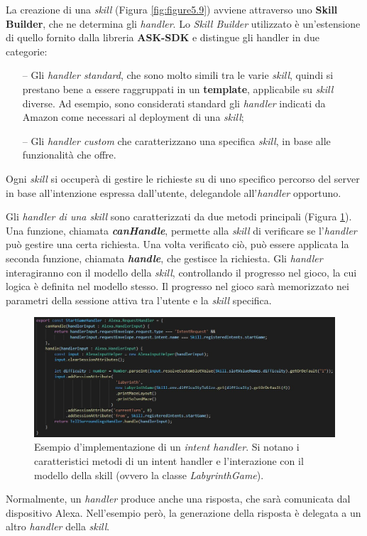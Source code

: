 La creazione di una \textit{skill} (Figura \ref{fig:figure5.9}) avviene
attraverso uno \textbf{Skill Builder}, che ne determina gli \textit{handler}.
Lo \textit{Skill Builder} utilizzato è un’estensione di quello fornito dalla
libreria \textbf{ASK-SDK} e distingue gli handler in due categorie:
\begin{itemize}
  \item[--] Gli \textit{handler standard}, che sono molto simili tra le varie
        \textit{skill}, quindi si prestano bene a essere raggruppati in un
        \textbf{template}, applicabile su \textit{skill} diverse. Ad esempio,
        sono considerati standard gli \textit{handler} indicati da Amazon come
        necessari al deployment di una \textit{skill};
  \item[--] Gli \textit{handler custom} che caratterizzano una specifica
        \textit{skill}, in base alle funzionalità che offre.
\end{itemize}
Ogni \textit{skill} si occuperà di gestire le richieste su di uno specifico
percorso del server in base all’intenzione espressa dall’utente, delegandole
all’\textit{handler} opportuno.

Gli \textit{handler di una skill} sono caratterizzati da due metodi principali
(Figura \ref{fig:figure5.10}). Una funzione, chiamata
\textit{\textbf{canHandle}}, permette alla \textit{skill} di verificare se
l’\textit{handler} può gestire una certa richiesta. Una volta verificato ciò,
può essere applicata la seconda funzione, chiamata \textit{\textbf{handle}},
che gestisce la richiesta. Gli \textit{handler} interagiranno con il modello
della \textit{skill}, controllando il progresso nel gioco, la cui logica è
definita nel modello stesso. Il progresso nel gioco sarà memorizzato nei
parametri della sessione attiva tra l’utente e la \textit{skill} specifica.

\begin{figure}[!ht]
  \centering
  \includegraphics[scale=0.49]{resources/images/implementation/code/skill-handler-code-example.jpg}
  \caption{
    Esempio d'implementazione di un \textit{intent handler}. Si notano i
    caratteristici metodi di un intent handler e l'interazione con il modello
    della skill (ovvero la classe \textit{LabyrinthGame}).
  }
  \label{fig:figure5.10}
\end{figure}

Normalmente, un \textit{handler} produce anche una risposta, che sarà
comunicata dal dispositivo Alexa. Nell’esempio però, la generazione della
risposta è delegata a un altro \textit{handler} della \textit{skill}.
